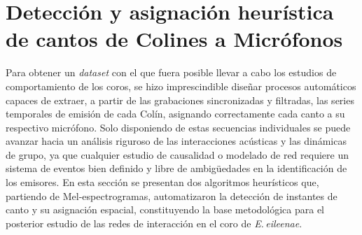 




\section{Detección y asignación heurística de cantos de Colines a Micrófonos}
\label{sec:deteccion_asignacion}


Para obtener un \emph{dataset} con el que fuera posible llevar a cabo 
los estudios de comportamiento de los coros, 
se hizo imprescindible diseñar procesos automáticos 
capaces de extraer, a partir de las grabaciones sincronizadas y 
filtradas, las series temporales de emisión de cada Colín,
asignando correctamente cada canto a su respectivo micrófono.
Solo disponiendo de estas secuencias individuales se puede 
avanzar hacia un análisis riguroso de las interacciones 
acústicas y las dinámicas de grupo, ya que cualquier estudio
de causalidad o modelado de red requiere un 
sistema de eventos bien definido y libre de ambigüedades en la 
identificación de los emisores. En esta sección se presentan 
dos algoritmos heurísticos que, partiendo de Mel-espectrogramas, 
automatizaron la detección de instantes de 
canto y su asignación espacial, constituyendo la base 
metodológica para el posterior estudio de las redes de 
interacción en el coro de \emph{E.\,eileenae}.



